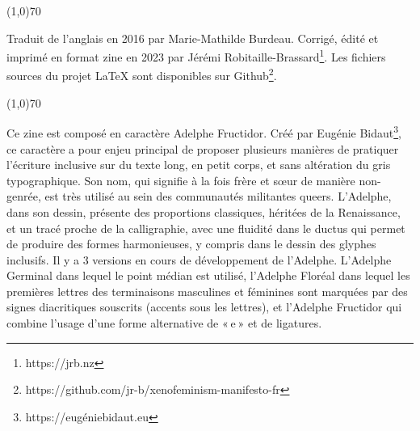\begin{center}
\line(1,0){70}
\end{center}
\singlespacing
\quote \footnotesize Traduit de l’anglais en 2016 par Marie-Mathilde Burdeau. Corrigé, édité et imprimé en format zine en 2023 par Jérémi Robitaille-Brassard\footnote{\selectfont https://jrb.nz}. Les fichiers sources du projet LaTeX sont disponibles sur Github\footnote{\selectfont https://github.com/jr-b/xenofeminism-manifesto-fr}. 

\begin{center}
\line(1,0){70}
\end{center}

\footnotesize Ce zine est composé en caractère Adelphe Fructidor. Créé par Eugénie Bidaut\footnote{\selectfont https://eugéniebidaut.eu}, ce caractère a pour enjeu principal de proposer plusieurs manières de pratiquer l’écriture inclusive sur du texte long, en petit corps, et sans altération du gris typographique. Son nom, qui signifie à la fois frère et sœur de manière non-genrée, est très utilisé au sein des communautés militantes queers. L’Adelphe, dans son dessin, présente des proportions classiques, héritées de la Renaissance, et un tracé proche de la calligraphie, avec une fluidité dans le ductus qui permet de produire des formes harmonieuses, y compris dans le dessin des glyphes inclusifs. Il y a 3 versions en cours de développement de l’Adelphe. L’Adelphe Germinal dans lequel le point médian est utilisé, l’Adelphe Floréal dans lequel les premières lettres des terminaisons masculines et féminines sont marquées par des signes diacritiques souscrits (accents sous les lettres), et l’Adelphe Fructidor qui combine l’usage d’une forme alternative de « e » et de ligatures. \\
